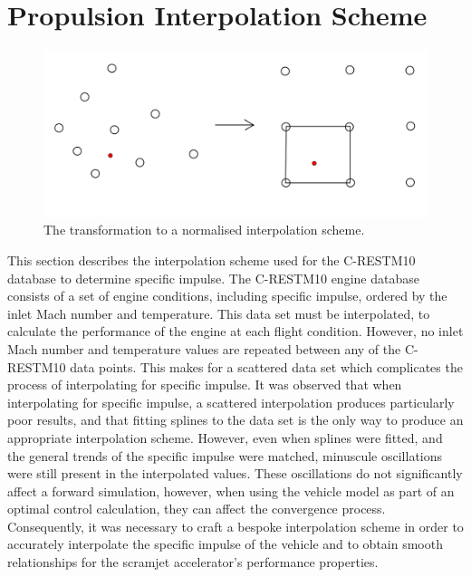 \section{Propulsion Interpolation Scheme}\label{Appendix:interp}
\noindent
\begin{figure}[ht]
	\centering
	\includegraphics[width=0.8\linewidth]{figures/A1_uncertainty-analysis/interp}
	\caption{The transformation to a normalised interpolation scheme.}
	\label{fig:interp}
\end{figure}
This section describes the interpolation scheme used for the C-RESTM10 database to determine specific impulse.
The C-RESTM10 engine database consists of a set of engine conditions, including specific impulse, ordered by the inlet Mach number and temperature. This data set must be interpolated, to calculate the performance of the engine at each flight condition. However, no inlet Mach number and temperature values are repeated between any of the C-RESTM10 data points. This makes for a scattered data set which complicates the process of interpolating for specific impulse. It was observed that when interpolating for specific impulse, a scattered interpolation produces particularly poor results, and that fitting splines to the data set is the only way to produce an appropriate interpolation scheme. However, even when splines were fitted, and the general trends of the specific impulse were matched, minuscule oscillations were still present in the interpolated values. These oscillations do not significantly affect a forward simulation, however, when using the vehicle model as part of an optimal control calculation, they can affect the convergence process. Consequently, it was necessary to craft a bespoke interpolation scheme in order to accurately interpolate the specific impulse of the vehicle and to obtain smooth relationships for the scramjet accelerator's performance properties. 

